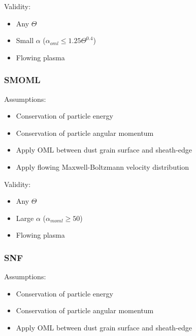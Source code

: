 \documentclass[journal]{Imperial_lab_report}
\begin{document}
\medskip

Validity:

\medskip

\begin{itemize}
\item Any $\Theta$
\item Small $\alpha$ ($\alpha_{oml} \leq 1.25\Theta^{0.4}$)
\item Flowing plasma 
\end{itemize}

\medskip

\subsubsection{SMOML}

\medskip

Assumptions:

\medskip

\begin{itemize}
\item Conservation of particle energy
\item Conservation of particle angular momentum
\item Apply OML between dust grain surface and sheath-edge
\item Apply flowing Maxwell-Boltzmann velocity distribution 
\end{itemize}

\medskip

Validity:

\medskip

\begin{itemize}
\item Any $\Theta$
\item Large $\alpha$ ($\alpha_{moml} \geq 50$)
\item Flowing plasma 
\end{itemize}

\medskip

\subsubsection{SNF}

\medskip

Assumptions:

\medskip

\begin{itemize}
\item Conservation of particle energy
\item Conservation of particle angular momentum
\item Apply OML between dust grain surface and sheath-edge
\end{itemize}
\end{document}
